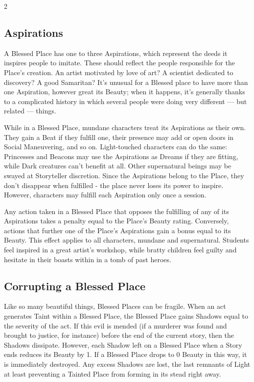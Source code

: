 \begin{multicols}{2}
\subsection*{Aspirations}

A Blessed Place has one to three Aspirations, which represent the deeds it inspires people to imitate. These should reflect the people responsible for the Place’s creation. An artist motivated by love of art? A scientist dedicated to discovery? A good Samaritan? It’s unusual for a Blessed place to have more than one Aspiration, however great its Beauty; when it happens, it’s generally thanks to a complicated history in which several people were doing very different — but related — things.

While in a Blessed Place, mundane characters treat its Aspirations as their own. They gain a Beat if they fulfill one, their presence may add or open doors in Social Maneuvering, and so on. Light-touched characters can do the same: Princesses and Beacons may use the Aspirations as Dreams if they are fitting, while Dark creatures can’t benefit at all. Other supernatural beings may be swayed at Storyteller discretion. Since the Aspirations belong to the Place, they don’t disappear when fulfilled - the place never loses its power to inspire. However, characters may fulfill each Aspiration only once a session.

Any action taken in a Blessed Place that opposes the fulfilling of any of its Aspirations takes a penalty equal to the Place’s Beauty rating. Conversely, actions that further one of the Place’s Aspirations gain a bonus equal to its Beauty. This effect applies to all characters, mundane and supernatural. Students feel inspired in a great artist's workshop, while bratty children feel guilty and hesitate in their boasts within in a tomb of past heroes.  

\subsection*{Corrupting a Blessed Place}

Like so many beautiful things, Blessed Places can be fragile. When an act generates Taint within a Blessed Place, the Blessed Place gains Shadows equal to the severity of the act. If this evil is mended (if a murderer was found and brought to justice, for instance) before the end of the current story, then the Shadows dissipate. However, each Shadow left on a Blessed Place when a Story ends reduces its Beauty by 1. If a Blessed Place drops to 0 Beauty in this way, it is immediately destroyed. Any excess Shadows are lost, the last remnants of Light at least preventing a Tainted Place from forming in its stead right away.


\end{multicols}
